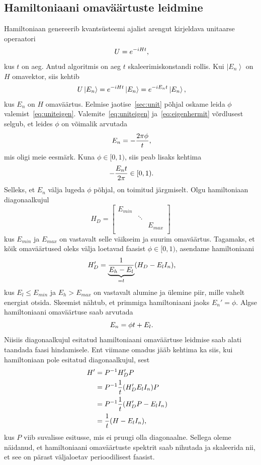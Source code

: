 \documentclass[12pt]{report}
\def\ket#1{\left|#1\right>}
\begin{document}
\subsection{Hamiltoniaani omaväärtuste leidmine}\label{sec:ham}

Hamiltoniaan genereerib kvantsüsteemi ajalist arengut kirjeldava unitaarse operaatori
\begin{align}
    U = e^{-iHt} \rlap{,}
\end{align}
kus \(t\) on aeg.
Antud algoritmis on aeg \(t\) skaleerimiskonstandi rollis.
Kui \(\ket{E_n}\) on \(H\) omavektor, siis kehtib
\begin{align}\label{eq:eigenhermit}
    U \ket{E_n} = e^{-iHt}\ket{E_n} = e^{-i E_n t} \ket{E_n} \rlap{,}
\end{align}
kus \(E_n\) on \(H\) omaväärtus.
Eelmise jaotise~\ref{sec:unit} põhjal oskame leida \(\phi\) valemist~\eqref{eq:uniteigen}.
Valemite~\eqref{eq:uniteigen} ja~\eqref{eq:eigenhermit} võrdlusest selgub, et leides \(\phi\) on võimalik arvutada
\begin{align}
    E_n = -\frac{2\pi\phi}{t} \rlap{,}
\end{align}
mis oligi meie eesmärk.
Kuna \(\phi \in [0, 1)\), siis peab lisaks kehtima
\begin{align}
    -\frac{E_n t}{2\pi} \in [0, 1) \rlap{.}
\end{align}
Selleks, et $E_n$ välja lugeda $\phi$ põhjal, on toimitud järgmiselt.
Olgu hamiltoniaan diagonaalkujul
\begin{equation}
H_D=\begin{bmatrix}
    E_{min} & & \\
    & \ddots & \\
    & & E_{max} \\
  \end{bmatrix}
\end{equation}
kus \(E_{min}\) ja \(E_{max}\) on vastavalt selle väikseim ja suurim omaväärtus.
Tagamaks, et kõik omaväärtused oleks välja loetavad faasist $\phi\in[0,1)$, asendame hamiltoniaani
\begin{equation}
  H_D'=\underbrace{\frac{1}{E_h-E_l}}_{=t}(H_D-E_{l}I_n)\rlap,
\end{equation}
kus $E_l \le E_{min}$ ja $E_h>E_{max}$ on vastavalt alumine ja ülemine piir, mille vahelt energiat otsida.
Skeemist nähtub, et primmiga hamiltoniaani jaoks $E_n'=\phi$.
Algse hamiltoniaani omaväärtuse saab arvutada
\begin{equation}
  E_n=\phi t+E_l\rlap.
\end{equation}
Niisiis diagonaalkujul esitatud hamiltoniaani omaväärtuse leidmise saab alati taandada faasi hindamisele.
Ent viimane omadus jääb kehtima ka siis, kui hamiltoniaan pole esitatud diagonaalkujul, sest
\begin{align}
H'&=P^{-1}H_D'P\cr
  &=P^{-1}\frac{1}{t}(H_D'E_{l}I_n)P\cr
  &=P^{-1}\frac{1}{t}(H_D'P-E_{l}I_n)\cr
  &=\frac{1}{t}(H-E_{l}I_n)\rlap,\cr
\end{align}
kus $P$ viib suvalisse esitusse, mis ei pruugi olla diagonaalne.
Sellega oleme näidanud, et hamiltoniaani omaväärtuste spektrit saab nihutada ja skaleerida nii, et see on pärast väljaloetav perioodilisest faasist.
\end{document}
